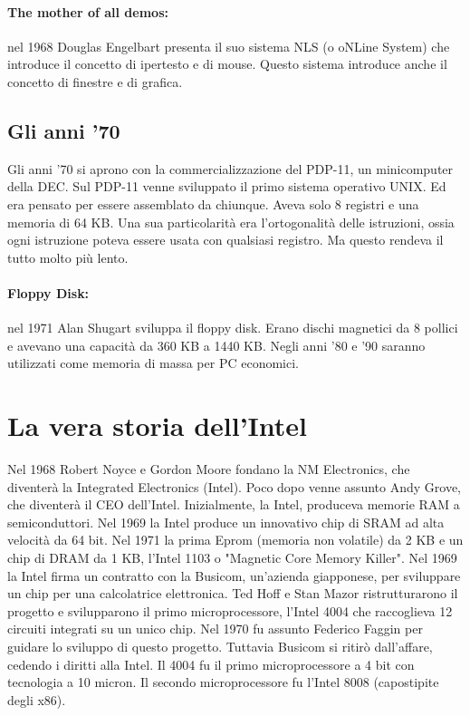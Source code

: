 \paragraph{The mother of all demos:} nel 1968 Douglas Engelbart presenta il suo
sistema NLS (o oNLine System) che introduce il concetto di ipertesto e di mouse.
Questo sistema introduce anche il concetto di finestre e di grafica.

\subsection{Gli anni '70}

Gli anni '70 si aprono con la commercializzazione del PDP-11, un minicomputer
della DEC. Sul PDP-11 venne sviluppato il primo sistema operativo UNIX. Ed era
pensato per essere assemblato da chiunque. Aveva solo 8 registri e una memoria
di 64 KB. Una sua particolarità era l'ortogonalità delle istruzioni, ossia
ogni istruzione poteva essere usata con qualsiasi registro. Ma questo rendeva
il tutto molto più lento.

\paragraph{Floppy Disk:} nel 1971 Alan Shugart sviluppa il floppy disk.
Erano dischi magnetici da 8 pollici e avevano una capacità da 360 KB a 1440 KB.
Negli anni '80 e '90 saranno utilizzati come memoria di massa per PC economici.

\section{La vera storia dell'Intel}

Nel 1968 Robert Noyce e Gordon Moore fondano la NM Electronics, che diventerà
la Integrated Electronics (Intel). Poco dopo venne assunto Andy Grove, che
diventerà il CEO dell'Intel. Inizialmente, la Intel, produceva memorie RAM a semiconduttori.
Nel 1969 la Intel produce un innovativo chip di SRAM ad alta velocità da 64 bit.
Nel 1971 la prima Eprom (memoria non volatile) da 2 KB e un chip di DRAM da 1 KB,
l'Intel 1103 o "Magnetic Core Memory Killer". 
Nel 1969 la Intel firma un contratto con la Busicom, un'azienda giapponese, per
sviluppare un chip per una calcolatrice elettronica. Ted Hoff e Stan Mazor ristrutturarono
il progetto e svilupparono il primo microprocessore, l'Intel 4004 che raccoglieva
12 circuiti integrati su un unico chip. Nel 1970 fu assunto Federico Faggin per
guidare lo sviluppo di questo progetto. Tuttavia Busicom si ritirò dall'affare,
cedendo i diritti alla Intel. Il 4004 fu il primo microprocessore a 4 bit con tecnologia
a 10 micron. Il secondo microprocessore fu l'Intel 8008 (capostipite degli x86).


